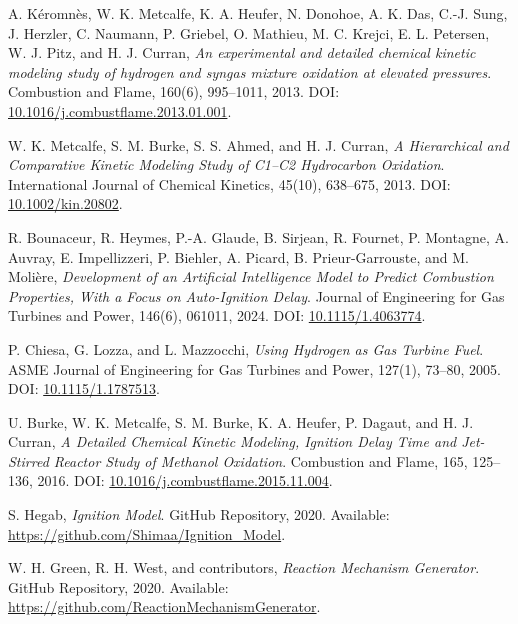 \documentclass[12pt]{report}
\begin{document}
\begin{thebibliography}{9}

A. Kéromnès, W. K. Metcalfe, K. A. Heufer, N. Donohoe, A. K. Das, C.-J. Sung, J. Herzler, C. Naumann, P. Griebel, O. Mathieu, M. C. Krejci, E. L. Petersen, W. J. Pitz, and H. J. Curran,
\textit{An experimental and detailed chemical kinetic modeling study of hydrogen and syngas mixture oxidation at elevated pressures}.
Combustion and Flame, 160(6), 995--1011, 2013. DOI: \href{https://doi.org/10.1016/j.combustflame.2013.01.001}{10.1016/j.combustflame.2013.01.001}.

W. K. Metcalfe, S. M. Burke, S. S. Ahmed, and H. J. Curran,
\textit{A Hierarchical and Comparative Kinetic Modeling Study of C1--C2 Hydrocarbon Oxidation}.
International Journal of Chemical Kinetics, 45(10), 638--675, 2013. DOI: \href{https://doi.org/10.1002/kin.20802}{10.1002/kin.20802}.

R. Bounaceur, R. Heymes, P.-A. Glaude, B. Sirjean, R. Fournet, P. Montagne, A. Auvray, E. Impellizzeri, P. Biehler, A. Picard, B. Prieur-Garrouste, and M. Molière,
\textit{Development of an Artificial Intelligence Model to Predict Combustion Properties, With a Focus on Auto-Ignition Delay}.
Journal of Engineering for Gas Turbines and Power, 146(6), 061011, 2024. DOI: \href{https://doi.org/10.1115/1.4063774}{10.1115/1.4063774}.

P. Chiesa, G. Lozza, and L. Mazzocchi, 
\textit{Using Hydrogen as Gas Turbine Fuel}. 
ASME Journal of Engineering for Gas Turbines and Power, 127(1), 73--80, 2005. DOI: \href{https://doi.org/10.1115/1.1787513}{10.1115/1.1787513}.

U. Burke, W. K. Metcalfe, S. M. Burke, K. A. Heufer, P. Dagaut, and H. J. Curran,
\textit{A Detailed Chemical Kinetic Modeling, Ignition Delay Time and Jet-Stirred Reactor Study of Methanol Oxidation}.
Combustion and Flame, 165, 125--136, 2016. DOI: \href{https://doi.org/10.1016/j.combustflame.2015.11.004}{10.1016/j.combustflame.2015.11.004}.

S. Hegab, 
\textit{Ignition Model}. 
GitHub Repository, 2020. Available: \href{https://github.com/Shimaa/Ignition_Model}{https://github.com/Shimaa/Ignition\_Model}.

W. H. Green, R. H. West, and contributors, 
\textit{Reaction Mechanism Generator}. 
GitHub Repository, 2020. Available: \href{https://github.com/ReactionMechanismGenerator}{https://github.com/ReactionMechanismGenerator}.


\end{thebibliography}
\end{document}
